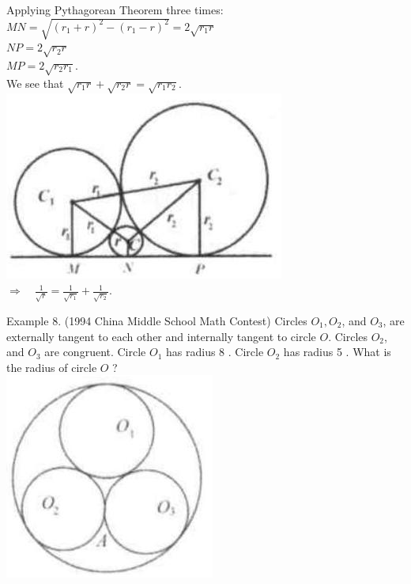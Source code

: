 \documentclass[10pt]{article}
\begin{document}
Applying Pythagorean Theorem three times:\\
\(M N=\sqrt{\left(r_{1}+r\right)^{2}-\left(r_{1}-r\right)^{2}}=2 \sqrt{r_{1} r}\)\\
\(N P=2 \sqrt{r_{2} r}\)\\
\(M P=2 \sqrt{r_{2} r_{1}}\).\\
We see that \(\sqrt{r_{1} r}+\sqrt{r_{2} r}=\sqrt{r_{1} r_{2}}\).\\
\includegraphics[max width=\textwidth, center]{2025_04_17_97bc1f7e44d93c271a88g-179(1)}\\
\(\Rightarrow \quad \frac{1}{\sqrt{r}}=\frac{1}{\sqrt{r_{1}}}+\frac{1}{\sqrt{r_{2}}}\).

Example 8. (1994 China Middle School Math Contest) Circles \(O_{1}, O_{2}\), and \(O_{3}\), are externally tangent to each other and internally tangent to circle \(O\). Circles \(O_{2}\), and \(O_{3}\) are congruent. Circle \(O_{1}\) has radius 8 . Circle \(O_{2}\) has radius 5 . What is the radius of circle \(O\) ?\\
\includegraphics[max width=\textwidth, center]{2025_04_17_97bc1f7e44d93c271a88g-179}
\end{document}

